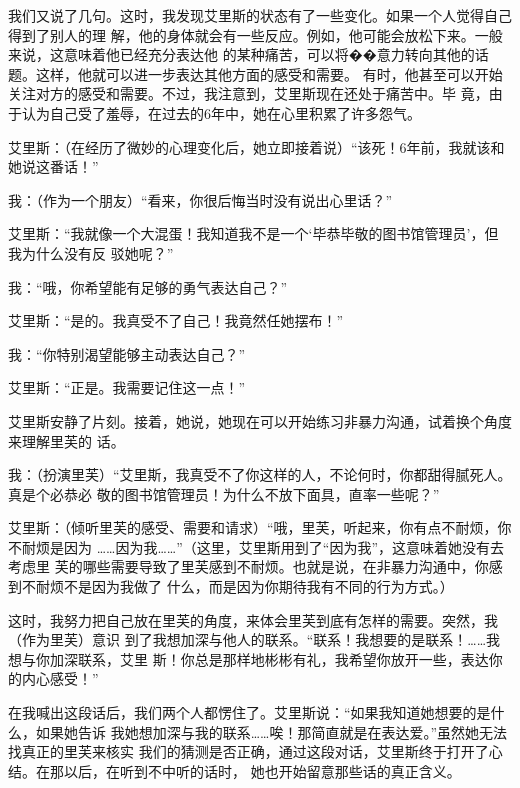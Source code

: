 \documentclass{ctexart}
\renewenvironment{quotation}{\setlength{\parskip}{0.5em}\setstretch{1.5}\kaishu\zihao{-5}\setlength{\parindent}{1em}}{\vspace{1em}}
\begin{document}
我们又说了几句。这时，我发现艾里斯的状态有了一些变化。如果一个人觉得自己得到了别人的理
解，他的身体就会有一些反应。例如，他可能会放松下来。一般来说，这意味着他已经充分表达他
的某种痛苦，可以将��意力转向其他的话题。这样，他就可以进一步表达其他方面的感受和需要。
有时，他甚至可以开始关注对方的感受和需要。不过，我注意到，艾里斯现在还处于痛苦中。毕
竟，由于认为自己受了羞辱，在过去的6年中，她在心里积累了许多怨气。

\begin{quotation}
	艾里斯：（在经历了微妙的心理变化后，她立即接着说）``该死！6年前，我就该和她说这番话！''

	我：（作为一个朋友）``看来，你很后悔当时没有说出心里话？''

	艾里斯：``我就像一个大混蛋！我知道我不是一个`毕恭毕敬的图书馆管理员'，但我为什么没有反
	驳她呢？''

	我：``哦，你希望能有足够的勇气表达自己？''

	艾里斯：``是的。我真受不了自己！我竟然任她摆布！''

	我：``你特别渴望能够主动表达自己？''

	艾里斯：``正是。我需要记住这一点！''
\end{quotation}

艾里斯安静了片刻。接着，她说，她现在可以开始练习非暴力沟通，试着换个角度来理解里芙的
话。

\begin{quotation}
	我：（扮演里芙）``艾里斯，我真受不了你这样的人，不论何时，你都甜得腻死人。真是个必恭必
	敬的图书馆管理员！为什么不放下面具，直率一些呢？''

	艾里斯：（倾听里芙的感受、需要和请求）``哦，里芙，听起来，你有点不耐烦，你不耐烦是因为
	\ldots\ldots 因为我\ldots\ldots''（这里，艾里斯用到了``因为我''，这意味着她没有去考虑里
	芙的哪些需要导致了里芙感到不耐烦。也就是说，在非暴力沟通中，你感到不耐烦不是因为我做了
	什么，而是因为你期待我有不同的行为方式。）
\end{quotation}

这时，我努力把自己放在里芙的角度，来体会里芙到底有怎样的需要。突然，我（作为里芙）意识
到了我想加深与他人的联系。``联系！我想要的是联系！\ldots\ldots 我想与你加深联系，艾里
斯！你总是那样地彬彬有礼，我希望你放开一些，表达你的内心感受！''

在我喊出这段话后，我们两个人都愣住了。艾里斯说：``如果我知道她想要的是什么，如果她告诉
我她想加深与我的联系\ldots\ldots 唉！那简直就是在表达爱。''虽然她无法找真正的里芙来核实
我们的猜测是否正确，通过这段对话，艾里斯终于打开了心结。在那以后，在听到不中听的话时，
她也开始留意那些话的真正含义。
\end{document}
